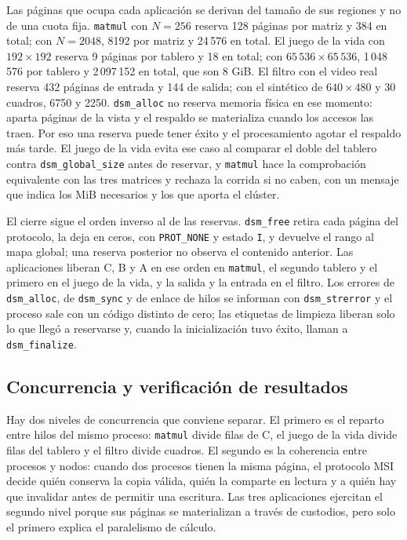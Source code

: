 Las páginas que ocupa cada aplicación se derivan del tamaño de sus regiones y no de una cuota fija. \texttt{matmul} con $N=256$ reserva 128 páginas por matriz y 384 en total; con $N=2048$, 8192 por matriz y 24\,576 en total. El juego de la vida con $192 \times 192$ reserva 9 páginas por tablero y 18 en total; con $65\,536 \times 65\,536$, 1\,048\,576 por tablero y 2\,097\,152 en total, que son 8 GiB. El filtro con el video real reserva 432 páginas de entrada y 144 de salida; con el sintético de $640 \times 480$ y 30 cuadros, 6750 y 2250. \texttt{dsm\_alloc} no reserva memoria física en ese momento: aparta páginas de la vista y el respaldo se materializa cuando los accesos las traen. Por eso una reserva puede tener éxito y el procesamiento agotar el respaldo más tarde. El juego de la vida evita ese caso al comparar el doble del tablero contra \texttt{dsm\_global\_size} antes de reservar, y \texttt{matmul} hace la comprobación equivalente con las tres matrices y rechaza la corrida si no caben, con un mensaje que indica los MiB necesarios y los que aporta el clúster.

El cierre sigue el orden inverso al de las reservas. \texttt{dsm\_free} retira cada página del protocolo, la deja en ceros, con \texttt{PROT\_NONE} y estado \texttt{I}, y devuelve el rango al mapa global; una reserva posterior no observa el contenido anterior. Las aplicaciones liberan C, B y A en ese orden en \texttt{matmul}, el segundo tablero y el primero en el juego de la vida, y la salida y la entrada en el filtro. Los errores de \texttt{dsm\_alloc}, de \texttt{dsm\_sync} y de enlace de hilos se informan con \texttt{dsm\_strerror} y el proceso sale con un código distinto de cero; las etiquetas de limpieza liberan solo lo que llegó a reservarse y, cuando la inicialización tuvo éxito, llaman a \texttt{dsm\_finalize}.

\subsection{Concurrencia y verificación de resultados}\label{sec:concurrencia-apps}

Hay dos niveles de concurrencia que conviene separar. El primero es el reparto entre hilos del mismo proceso: \texttt{matmul} divide filas de C, el juego de la vida divide filas del tablero y el filtro divide cuadros. El segundo es la coherencia entre procesos y nodos: cuando dos procesos tienen la misma página, el protocolo MSI decide quién conserva la copia válida, quién la comparte en lectura y a quién hay que invalidar antes de permitir una escritura. Las tres aplicaciones ejercitan el segundo nivel porque sus páginas se materializan a través de custodios, pero solo el primero explica el paralelismo de cálculo.

